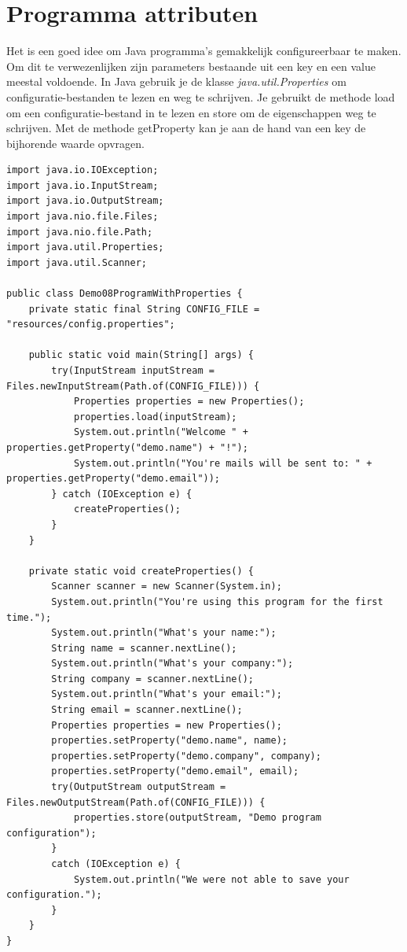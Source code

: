 \documentclass{tstextbook}
\begin{document}
\section{Programma attributen}

Het is een goed idee om Java programma's gemakkelijk configureerbaar te maken. 
Om dit te verwezenlijken zijn parameters bestaande uit een key en een value meestal voldoende. 
In Java gebruik je de klasse \textit{java.util.Properties} om configuratie-bestanden te lezen en weg te schrijven.
Je gebruikt de methode load om een configuratie-bestand in te lezen en store om de eigenschappen weg te schrijven. Met de methode getProperty kan je aan de hand van een key de bijhorende waarde opvragen.

\begin{lstlisting}
import java.io.IOException;
import java.io.InputStream;
import java.io.OutputStream;
import java.nio.file.Files;
import java.nio.file.Path;
import java.util.Properties;
import java.util.Scanner;

public class Demo08ProgramWithProperties {
	private static final String CONFIG_FILE = "resources/config.properties";

	public static void main(String[] args) {
		try(InputStream inputStream = Files.newInputStream(Path.of(CONFIG_FILE))) {
			Properties properties = new Properties();
			properties.load(inputStream);
			System.out.println("Welcome " + properties.getProperty("demo.name") + "!");
			System.out.println("You're mails will be sent to: " + properties.getProperty("demo.email"));
		} catch (IOException e) {
			createProperties();
		}
	}

	private static void createProperties() {
		Scanner scanner = new Scanner(System.in);
		System.out.println("You're using this program for the first time.");
		System.out.println("What's your name:");
		String name = scanner.nextLine();
		System.out.println("What's your company:");
		String company = scanner.nextLine();
		System.out.println("What's your email:");
		String email = scanner.nextLine();
		Properties properties = new Properties();
		properties.setProperty("demo.name", name);
		properties.setProperty("demo.company", company);
		properties.setProperty("demo.email", email);
		try(OutputStream outputStream = Files.newOutputStream(Path.of(CONFIG_FILE))) {
			properties.store(outputStream, "Demo program configuration");
		}
		catch (IOException e) {
			System.out.println("We were not able to save your configuration.");
		}
	}
}
\end{lstlisting}
\end{document}
